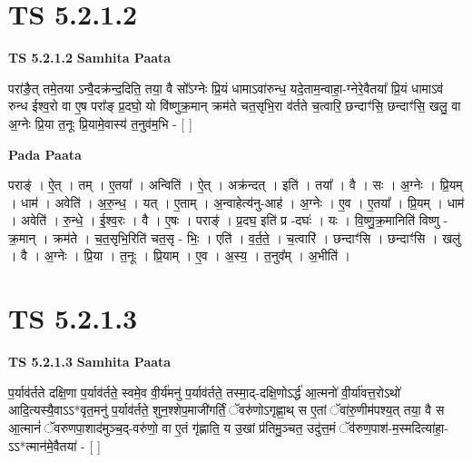 \documentclass[17pt]{extarticle}
\begin{document}
\section*{ TS 5.2.1.2 }

\textbf{TS 5.2.1.2 } \newline
\textbf{Samhita Paata} \newline

परा॑ङै॒त् तमे॒तया ऽन्वै॒दक्र॑न्द॒दिति॒ तया॒ वै सो᳚ऽग्नेः प्रि॒यं धामाऽवा॑रुन्ध॒ यदे॒ताम॒न्वाहा॒-ग्नेरे॒वैतया᳚ प्रि॒यं धामाऽव॑ रुन्ध ईश्व॒रो वा ए॒ष परा᳚ङ् प्र॒दघो॒ यो वि॑ष्णुक्र॒मान् क्रम॑ते चत॒सृभि॒रा व॑र्तते च॒त्वारि॒ छन्दाꣳ॑सि॒ छन्दाꣳ॑सि॒ खलु॒ वा अ॒ग्नेः प्रि॒या त॒नूः प्रि॒यामे॒वास्य॑ त॒नुव॑म॒भि - [  ] \newline

\textbf{Pada Paata} \newline

पराङ्॑ । ऐ॒त् । तम् । ए॒तया᳚ । अन्विति॑ । ऐ॒त् । अक्र॑न्दत् । इति॑ । तया᳚ । वै । सः । अ॒ग्नेः । प्रि॒यम् । धाम॑ । अवेति॑ । अ॒रु॒न्ध॒ । यत् । ए॒ताम् । अ॒न्वाहेत्य॑नु-आह॑ । अ॒ग्नेः । ए॒व । ए॒तया᳚ । प्रि॒यम् । धाम॑ । अवेति॑ । रु॒न्धे॒ । ई॒श्व॒रः । वै । ए॒षः । पराङ्॑ । प्र॒दघ॒ इति॑ प्र -दघः॑ । यः । वि॒ष्णु॒क्र॒मानिति॑ विष्णु - क्र॒मान् । क्रम॑ते । च॒त॒सृभि॒रिति॑ चत॒सृ - भिः॒ । एति॑ । व॒र्त॒ते॒ । च॒त्वारि॑ । छन्दाꣳ॑सि । छन्दाꣳ॑सि । खलु॑ । वै । अ॒ग्नेः । प्रि॒या । त॒नूः । प्रि॒याम् । ए॒व । अ॒स्य॒ । त॒नुव᳚म् । अ॒भीति॑ ।  \newline




\section*{ TS 5.2.1.3 }

\textbf{TS 5.2.1.3 } \newline
\textbf{Samhita Paata} \newline

प॒र्याव॑र्तते दक्षि॒णा प॒र्याव॑र्तते॒ स्वमे॒व वी॒र्य॑मनु॑ प॒र्याव॑र्तते॒ तस्मा॒द्-दक्षि॒णोऽर्द्ध॑ आ॒त्मनो॑ वी॒र्या॑वत्त॒रोऽथो॑ आदि॒त्यस्यै॒वाऽऽ*वृत॒मनु॑ प॒र्याव॑र्तते॒ शुन॒श्शेप॒माजी॑गर्तिं॒ ॅवरु॑णोऽगृह्णा॒थ् स ए॒तां ॅवा॑रु॒णीम॑पश्य॒त् तया॒ वै स आ॒त्मानं॑ ॅवरुणपा॒शाद॑मुञ्च॒द्-वरु॑णो॒ वा ए॒तं गृ॑ह्णाति॒ य उ॒खां प्र॑तिमु॒ञ्चत॒ उदु॑त्त॒मं ॅव॑रुण॒पाश॑-म॒स्मदित्या॑हा॒-ऽऽ*त्मान॑मे॒वैतया॑ - [  ] \newline
\end{document}
